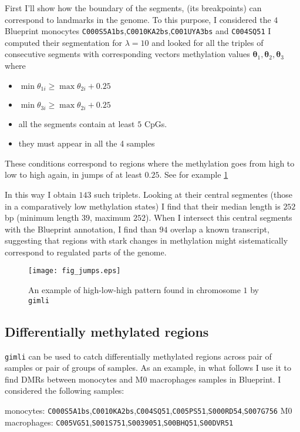 \documentclass[12pt]{amsart}
\newcommand{\gimli}{\texttt{gimli}}
\begin{document}
First I'll show how the boundary of the segments, (its  breakpoints)
can correspond to landmarks in the genome. To this purpose, I considered the 
$4$ Blueprint monocytes \verb=C000S5A1bs=,\verb=C0010KA2bs=,\verb=C001UYA3bs= and \verb=C004SQ51= 
I computed their segmentation for $\lambda=10$ and looked for all the triples of consecutive segments
with corresponding vectors methylation values $\pmb{\theta}_{1},\pmb{\theta}_{2},\pmb{\theta}_{3}$
where 
\begin{itemize}
\item{} $\min \theta_{1i} \geq \max \theta_{2i} + 0.25$
\item{} $\min \theta_{3i} \geq \max \theta_{2i} + 0.25$
\item{} all the segments contain at least $5$ CpGs.
\item{} they must appear in all the 4 samples
\end{itemize}

These conditions correspond to regions where the methylation goes from high to low to high again,
in jumps of at least $0.25$.
See for example \ref{fig_jumps} 

In this way I obtain $143$ such triplets. Looking at their central segmentes
(those in a comparatively low methylation states) I find that their median length is
$252$bp (minimum length $39$, maximum $252$). When I intersect this central segments with the Blueprint
annotation, I find than $94$ overlap a known transcript, suggesting that regions with stark 
changes in methylation
might sistematically correspond to regulated parts of the genome.

\begin{figure}\label{fig_jumps}
\texttt{[image: fig\_jumps.eps]}
\caption{An example of high-low-high pattern found in chromosome $1$ by \gimli{}}
\end{figure}

\subsection{Differentially methylated regions}

\gimli{} can be used to catch differentially methylated regions across pair of samples
or pair of groups of samples.
As an example, in what follows I use it to find DMRs between monocytes and M0 macrophages samples in Blueprint. 
I considered the following samples:


monocytes: \texttt{C000S5A1bs},\texttt{C0010KA2bs},\texttt{C004SQ51},\texttt{C005PS51},\texttt{S000RD54},\texttt{S007G756}
M0 macrophages: \texttt{C005VG51},\texttt{S001S751},\texttt{S0039051},\texttt{S00BHQ51},\texttt{S00DVR51}
\end{document}
